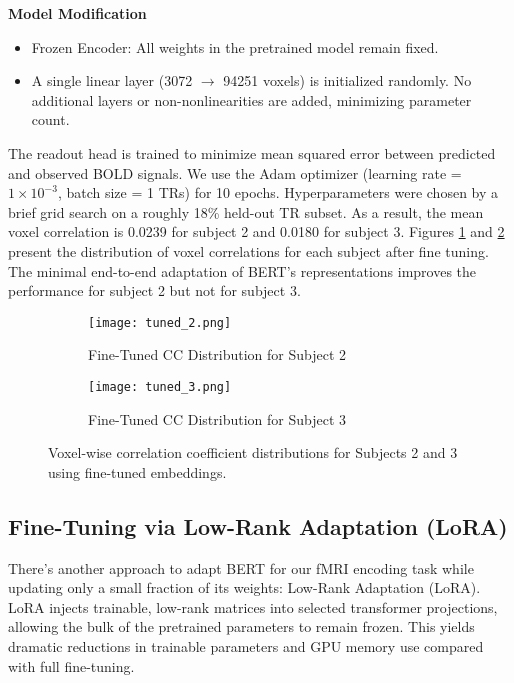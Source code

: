 \documentclass{article}
\begin{document}
\textbf{Model Modification}
\begin{itemize}
    \item Frozen Encoder: All weights in the pretrained model remain fixed.
    \item A single linear layer (3072 $\rightarrow$ 94251 voxels) is initialized randomly. No additional layers or non-nonlinearities are added, minimizing parameter count.
\end{itemize}

The readout head is trained to minimize mean squared error between predicted and observed BOLD signals. We use the Adam optimizer (learning rate = $1\times10^{-3}$, batch size = 1 TRs) for 10 epochs. Hyperparameters were chosen by a brief grid search on a roughly 18\% held-out TR subset. As a result, the mean voxel correlation is 0.0239 for subject 2 and 0.0180 for subject 3. Figures \ref{fig:tuned_cc_2} and \ref{fig:tuned_cc_3} present the distribution of voxel correlations for each subject after fine tuning. The minimal end-to-end adaptation of BERT's representations improves the performance for subject 2 but not for subject 3.

\begin{figure}[htbp]
\centering
\begin{subfigure}[b]{0.45\linewidth}
    \centering
    \texttt{[image: tuned\_2.png]}
    \caption{Fine-Tuned CC Distribution for Subject 2}
    \label{fig:tuned_cc_2}
\end{subfigure}
\hfill
\begin{subfigure}[b]{0.45\linewidth}
    \centering
    \texttt{[image: tuned\_3.png]}
    \caption{Fine-Tuned CC Distribution for Subject 3}
    \label{fig:tuned_cc_3}
\end{subfigure}
\caption{Voxel-wise correlation coefficient distributions for Subjects 2 and 3 using fine-tuned embeddings.}
\label{fig:tuned_ccs}
\end{figure}

\subsection{Fine-Tuning via Low-Rank Adaptation (LoRA)}

There's another approach to adapt BERT for our fMRI encoding task while updating only a small fraction of its weights: Low-Rank Adaptation (LoRA). LoRA injects trainable, low-rank matrices into selected transformer projections, allowing the bulk of the pretrained parameters to remain frozen. This yields dramatic reductions in trainable parameters and GPU memory use compared with full fine-tuning.
\end{document}
